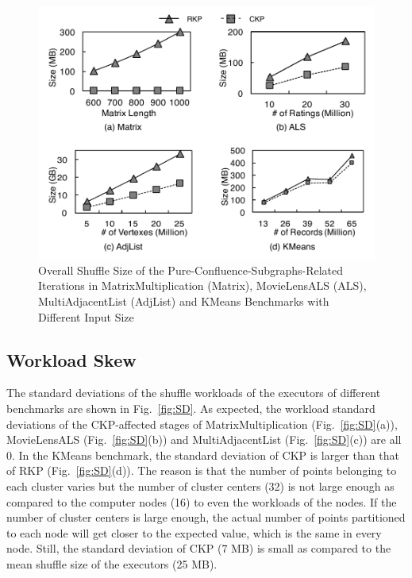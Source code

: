 \documentclass[10pt,journal,compsoc]{IEEEtran}
\begin{document}
\begin{figure}[!t]
\centering
\includegraphics[width=1\columnwidth]{figure7}
\caption{Overall Shuffle Size of the Pure-Confluence-Subgraphs-Related Iterations in MatrixMultiplication (Matrix), MovieLensALS (ALS), MultiAdjacentList (AdjList) and KMeans Benchmarks with Different Input Size}
\label{fig:sizeLine}
\end{figure}

\subsection{Workload Skew}
The standard deviations of the shuffle workloads of the executors of different benchmarks are shown in Fig.~\ref{fig:SD}. 
As expected, the workload standard deviations of the CKP-affected stages of MatrixMultiplication (Fig.~\ref{fig:SD}(a)), MovieLensALS (Fig.~\ref{fig:SD}(b)) and MultiAdjacentList (Fig.~\ref{fig:SD}(c)) are all 0. 
In the KMeans benchmark, the standard deviation of CKP is larger than that of RKP (Fig.~\ref{fig:SD}(d)). 
The reason is that the number of points belonging to each cluster varies but the number of cluster centers (32) is not large enough as compared to 
the computer nodes (16) to even the workloads of the nodes. 
If the number of cluster centers is large enough, the actual number of points partitioned to each node will get closer to the expected value, 
which is the same in every node.
Still, the standard deviation of CKP (7 MB) is small as compared to the mean shuffle size of the executors (25 MB).
\end{document}
